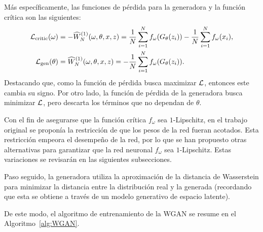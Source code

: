 Más específicamente, las funciones de pérdida para la generadora y la función crítica son las siguientes:
\begin{align}
    \mathcal{L}_{\mathrm{critic}}(\omega)
     & = -\widehat W_N^{(1)} (
    \omega, \theta, x, z
    )
    = \frac{1}{N}\sum_{i=1}^{N} f_\omega(G_\theta(z_i)) - \frac{1}{N}\sum_{i=1}^{N} f_\omega(x_i),
    \\ \mathcal{L}_{\mathrm{gen}}(\theta)
     & = \widehat W_N^{(1)} (
    \omega, \theta, x, z
    )
    = -\frac{1}{N}\sum_{i=1}^{N} f_\omega(G_\theta(z_i)).
\end{align}
Destacando que, como la función de pérdida busca maximizar $\mathcal{L}$, entonces este cambia su signo. Por otro lado, la función de pérdida de la generadora busca minimizar $\mathcal{L}$, pero descarta los términos que no dependan de $\theta$.

Con el fin de asegurarse que la función crítica $f_\omega$ sea $1$-Lipschitz, en el trabajo original se proponía la restricción de que los pesos de la red fueran acotados. Esta restricción empeora el desempeño de la red, por lo que se han propuesto otras alternativas para garantizar que la red neuronal $f_\omega$ sea $1$-Lipschitz. Estas variaciones se revisarán en las siguientes subsecciones.

Paso seguido, la generadora utiliza la aproximación de la distancia de Wasserstein para minimizar la distancia entre la distribución real y la generada (recordando que esta se obtiene a través de un modelo generativo de espacio latente).

De este modo, el algoritmo de entrenamiento de la WGAN se resume en el Algoritmo~\ref{alg:WGAN}.

